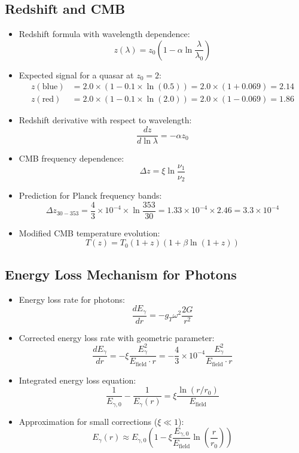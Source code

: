 \documentclass[12pt,a4paper]{article}
\begin{document}
	\subsection{Redshift and CMB}
\begin{itemize}
	\item Redshift formula with wavelength dependence:
	$$z(\lambda) = z_0\left(1 - \alpha \ln\frac{\lambda}{\lambda_0}\right)$$
	
	\item Expected signal for a quasar at $z_0 = 2$:
	\begin{align*}
		z(\text{blue}) &= 2.0 \times (1 - 0.1 \times \ln(0.5)) = 2.0 \times (1 + 0.069) = 2.14\\
		z(\text{red}) &= 2.0 \times (1 - 0.1 \times \ln(2.0)) = 2.0 \times (1 - 0.069) = 1.86
	\end{align*}
	
	\item Redshift derivative with respect to wavelength:
	$$\frac{dz}{d\ln\lambda} = -\alpha z_0$$
	
	\item CMB frequency dependence:
	$$\Delta z = \xi \ln\frac{\nu_1}{\nu_2}$$
	
	\item Prediction for Planck frequency bands:
	$$\Delta z_{30-353} = \frac{4}{3} \times 10^{-4} \times \ln\frac{353}{30} = 1.33 \times 10^{-4} \times 2.46 = 3.3 \times 10^{-4}$$
	
	\item Modified CMB temperature evolution:
	$$\boxed{T(z) = T_0(1+z)\left(1 + \beta \ln(1+z)\right)}$$
\end{itemize}

	\subsection{Energy Loss Mechanism for Photons}
	\begin{itemize}
		\item Energy loss rate for photons:
		$$\frac{dE_\gamma}{dr} = -g_T \omega^2 \frac{2G}{r^2}$$
		
		\item Corrected energy loss rate with geometric parameter:
		$$\boxed{\frac{dE_\gamma}{dr} = -\xi \frac{E_\gamma^2}{E_{\text{field}} \cdot r} = -\frac{4}{3} \times 10^{-4} \frac{E_\gamma^2}{E_{\text{field}} \cdot r}}$$
		
		\item Integrated energy loss equation:
		$$\frac{1}{E_{\gamma,0}} - \frac{1}{E_\gamma(r)} = \xi \frac{\ln(r/r_0)}{E_{\text{field}}}$$
		
		\item Approximation for small corrections ($\xi \ll 1$):
		$$E_\gamma(r) \approx E_{\gamma,0} \left(1 - \xi \frac{E_{\gamma,0}}{E_{\text{field}}} \ln\left(\frac{r}{r_0}\right)\right)$$
	\end{itemize}
	
\end{document}

